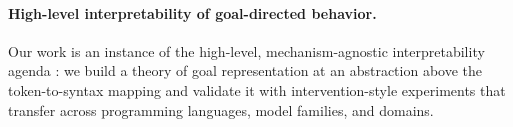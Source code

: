\paragraph{High-level interpretability of goal-directed behavior.} Our work is an instance of the
high-level, mechanism-agnostic interpretability agenda \citep{greenblatt2024highlevel}: we build a
theory of goal representation at an abstraction above the token-to-syntax mapping and validate it with
intervention-style experiments that transfer across programming languages, model families, and domains.
